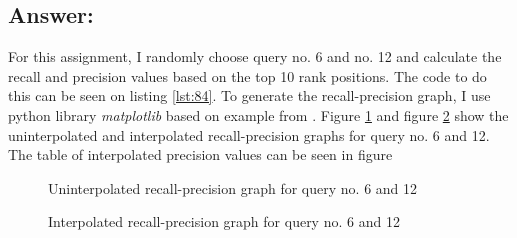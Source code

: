 \documentclass[letterpaper,11pt]{article}
\begin{document}
\subsection*{Answer:}
For this assignment, I randomly choose query no. 6 and no. 12 and calculate the recall and precision values based on the top 10 rank positions. The code to do this can be seen on listing \ref{lst:84}. To generate the recall-precision graph, I use python library \textit{matplotlib} \cite{matplotlib} based on example from \cite{matplotlib-example}. 
\newline
Figure \ref{fig:84_uninterpolated} and figure \ref{fig:84_interpolated} show the uninterpolated and interpolated recall-precision graphs for query no. 6 and 12. The table of interpolated precision values can be seen in figure 

\begin{figure}[H]
	\centering
	\caption{Uninterpolated recall-precision graph for query no. 6 and 12}
	\label{fig:84_uninterpolated}
\end{figure}

\begin{figure}[H]
	\centering
	\caption{Interpolated recall-precision graph for query no. 6 and 12}
	\label{fig:84_interpolated}
\end{figure}
\end{document}
